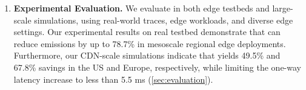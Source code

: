 \begin{enumerate}[leftmargin=*]
   
    \item \textbf{Experimental Evaluation.} We evaluate \proposedsystem in both edge testbeds and large-scale simulations, using real-world traces, edge workloads, and diverse edge settings. Our experimental results on real testbed demonstrate that \proposedsystem can reduce emissions by up to 78.7\% in mesoscale regional edge deployments. Furthermore, our CDN-scale simulations indicate that \proposedsystem yields 49.5\% and 67.8\% savings in the US and Europe, respectively, while limiting the one-way latency increase to less than 5.5 ms %
    (\autoref{sec:evaluation}).
    
    
\end{enumerate}






